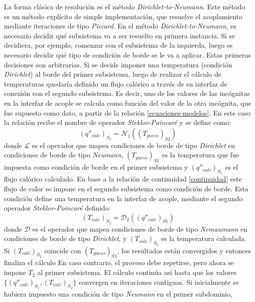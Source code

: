 La forma clásica de resolución es el método \textit{Dirichlet-to-Neumann}.
Este método es un método explícito de simple implementación, que resuelve el acoplamiento mediante iteraciones de tipo \textit{Piccard}.
En el método \textit{Dirichlet-to-Neumann}, es necesario decidir qué subsistema va a ser resuelto en primera instancia.
Si se decidiera, por ejemplo, comenzar con el subsistema de la izquierda, luego es necesario decidir qué tipo de condición de borde se le va a aplicar.
Estas primeras decisiones son arbitrarias.
Si se decide imponer una temperatura (condición \textit{Dirichlet}) al borde del primer subsistema,
luego de realizar el cálculo de temperaturas quedaría definido un flujo calórico a través de su interfaz de conexión con el segundo subsistema.
Es decir, uno de los valores de las incógnitas en la interfaz de acople se calcula como función del valor de la otra incógnita, 
que fue supuesto como dato, a partir de la relación \ref{ecuaciones-modelos}.
En este caso la relación recibe el nombre de operador \textit{Steklov-Poincaré} y se define como:
\begin{equation}
(q''_{calc})_{S_1} = \mathscr{N}_1\left ((T_{guess})_{S1}\right )
\label{q_n_t}
\end{equation}
donde $\mathscr{L}$ es el operador que mapea condiciones de borde de tipo \textit{Dirichlet} en condiciones de borde de tipo \textit{Neumann},
$(T_{guess})_{S1}$ es la temperatura que fue impuesta como condición de borde en el primer subsistema y $(q''_{calc})_{S_1}$ es el flujo calórico calculado.
En base a la relación de continuidad \ref{continuidad} este flujo de calor se impone en el segundo subsistema como condición de borde.
Esta condición define una temperatura en la interfaz de acople, mediante el segundo operador \textit{Steklov-Poincaré} definido:
\begin{equation}
(T_{calc})_{S_2} = \mathscr{D}_2\left ((q''_{calc})_{S1}\right )
\label{t_d_q}
\end{equation}
donde $\mathscr{D}$ es el operador que mapea condiciones de borde de tipo \textit{Nemaumann} en condiciones de borde de tipo \textit{Dirichlet},
y $(T_{calc})_{S_2}$ es la temperatura calculada.
Si $(T_{calc})_{S_2}$ coincide con $(T_{guess})_{S1}$, los resultados están convergidos y entonces finaliza el cálculo
En caso contrario, el proceso debe repetirse, pero ahora se impone $T_2$ al primer subsistema.
El cálculo continúa así hasta que los valores $\{(q''_{calc})_{S_1}, (T_{calc})_{S_2}\}$ convergen en iteraciones contiguas.
Si inicialmente se hubiera impuesto una condición de tipo \textit{Neumann} en el primer subdominio, 
